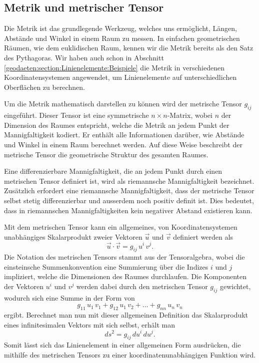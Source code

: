 \subsection{Metrik und metrischer Tensor}
Die Metrik ist das grundlegende Werkzeug, welches uns ermöglicht, Längen, Abstände und Winkel in einem Raum zu messen.
In einfachen geometrischen Räumen, wie dem euklidischen Raum, kennen wir die Metrik bereits als den Satz des Pythagoras.
Wir haben auch schon in Abschnitt \ref{geodaeten:section:Linienelemente:Beispiele} die Metrik in verschiedenen Koordinatensystemen angewendet, um Linienelemente auf unterschiedlichen Oberflächen zu berechnen.

Um die Metrik mathematisch darstellen zu können wird der metrische Tensor $g_{i\!j}$ eingeführt.
%
%
Dieser Tensor ist eine symmetrische $n \times n$-Matrix, wobei $n$ der Dimension des Raumes entspricht, welche die Metrik an jedem Punkt der Mannigfaltigkeit kodiert.
Er enthält alle Informationen darüber, wie Abstände und Winkel in einem Raum berechnet werden.
Auf diese Weise beschreibt der metrische Tensor die geometrische Struktur des gesamten Raumes.

Eine differenzierbare Mannigfaltigkeit, die an jedem Punkt durch einen metrischen Tensor definiert ist, wird als riemannsche Mannigfaltigkeit bezeichnet. Zusätzlich erfordert eine riemannsche Mannigfaltigkeit, dass der metrische Tensor selbst stetig differenzierbar und ausserdem noch positiv definit ist. 
Dies bedeutet, dass in riemannschen Mannigfaltigkeiten kein negativer Abstand existieren kann.

Mit dem metrischen Tensor kann ein allgemeines, von Koordinatensystemen unabhängiges Skalarprodukt zweier Vektoren $\vec{u}$ und $\vec{v}$ definiert werden als
\begin{equation}
	\vec{u} \cdot \vec{v} = g_{i\!j} \, u^i \, v^j.
\end{equation}
Die Notation des metrischen Tensors stammt aus der Tensoralgebra,
%
wobei die einsteinsche Summenkonvention eine Summierung über die Indizes $i$ und $j$ impliziert, welche die Dimensionen des Raumes durchlaufen.
%
%
Die Komponenten der Vektoren $u^i$ und $v^j$ werden dabei durch den metrischen Tensor $g_{i\!j}$ gewichtet, wodurch sich eine Summe in der Form von
\begin{equation}
	g_{11} \, u_1 \, v_1 + g_{12} \, u_1 \, v_2 + \dots + g_{nn} \, u_n \, v_n
\end{equation}
ergibt.
Berechnet man nun mit dieser allgemeinen Definition das Skalarprodukt eines infinitesimalen Vektors mit sich selbst, erhält man
\begin{equation}
	ds^2 = g_{i\!j} \, du^i \, du^j.
	\label{geodaeten:equation:MetrischerTensor:AllgemeinesLinienelement}
\end{equation}
Somit lässt sich das Linienelement in einer allgemeinen Form ausdrücken, die mithilfe des metrischen Tensors zu einer koordinatenunabhängigen Funktion wird.

